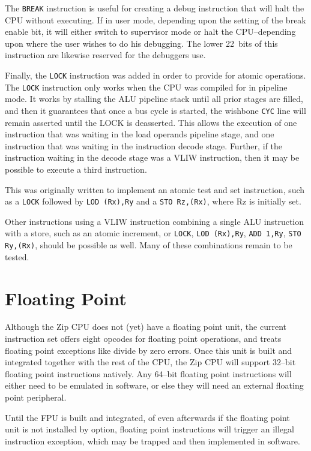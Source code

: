 \documentclass{gqtekspec}
\begin{document}
The {\tt BREAK} instruction is useful for creating a debug instruction that
will halt the CPU without executing.  If in user mode, depending upon the
setting of the break enable bit, it will either switch to supervisor mode or
halt the CPU--depending upon where the user wishes to do his debugging.  The
lower 22~bits of this instruction are likewise reserved for the debuggers
use.

Finally, the {\tt LOCK} instruction was added in order to provide for
atomic operations.  The {\tt LOCK} instruction only works when the CPU was
compiled for in pipeline mode.  It works by stalling the ALU pipeline stack
until all prior stages are filled, and then it guarantees that once a bus
cycle is started, the wishbone {\tt CYC} line will remain asserted until the
LOCK is deasserted.  This allows the execution of one instruction that was
waiting in the load operands pipeline stage, and one instruction that was
waiting in the instruction decode stage.  Further, if the instruction waiting
in the decode stage was a VLIW instruction, then it may be possible to execute
a third instruction.

This was originally written to implement an atomic test and set instruction,
such as a {\tt LOCK} followed by {\tt LOD (Rx),Ry} and a {\tt STO Rz,(Rx)},
where Rz is initially set.

Other instructions using a VLIW instruction combining a single ALU instruction
with a store, such as an atomic increment, or {\tt LOCK}, {\tt LOD (Rx),Ry},
{\tt ADD 1,Ry}, {\tt STO Ry,(Rx)}, should be possible as well.  Many of these
combinations remain to be tested.

\section{Floating Point}
Although the Zip CPU does not (yet) have a floating point unit, the current
instruction set offers eight opcodes for floating point operations, and treats
floating point exceptions like divide by zero errors.  Once this unit is built
and integrated together with the rest of the CPU, the Zip CPU will support
32--bit floating point instructions natively.  Any 64--bit floating point
instructions will either need to be emulated in software, or else they will
need an external floating point peripheral.

Until the FPU is built and integrated, of even afterwards if the floating point
unit is not installed by option, floating point instructions will trigger an
illegal instruction exception, which may be trapped and then implemented in
software.
\end{document}
